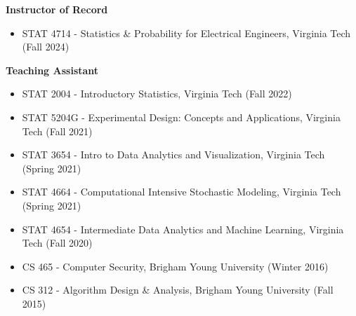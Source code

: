 \documentclass[margin,line]{res}
\begin{document}
\begin{resume}
{\bf Instructor of Record}
\begin{itemize}
\itemsep -0.9pt
\item {\sc STAT 4714} - Statistics \& Probability for Electrical Engineers, {\sc Virginia Tech} (Fall 2024)
\end{itemize}

{\bf Teaching Assistant}
\begin{itemize}
\itemsep -0.9pt
\item {\sc STAT 2004} - Introductory Statistics, {\sc Virginia Tech} (Fall 2022)
\item {\sc STAT 5204G} - Experimental Design: Concepts and Applications, {\sc Virginia Tech} (Fall 2021)
\item {\sc STAT 3654} - Intro to Data Analytics and Visualization, {\sc Virginia Tech} (Spring 2021)
\item {\sc STAT 4664} - Computational Intensive Stochastic Modeling, {\sc Virginia Tech} (Spring 2021)
\item {\sc STAT 4654} - Intermediate Data Analytics and Machine Learning, {\sc Virginia Tech} (Fall 2020)
\item {\sc CS 465} - Computer Security, {\sc Brigham Young University} (Winter 2016)
\item {\sc CS 312} - Algorithm Design \& Analysis, {\sc Brigham Young University} (Fall 2015)
\end{itemize}


\end{resume}
\end{document}
